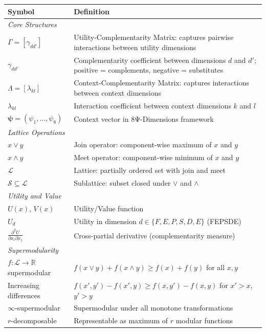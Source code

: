 \begin{table}[h]
\centering
\small
\begin{tabular}{p{2.5cm}p{10cm}}
\toprule
\textbf{Symbol} & \textbf{Definition} \\
\midrule
\multicolumn{2}{l}{\textit{Core Structures}} \\
$\Gamma = [\gamma_{dd'}]$ & Utility-Complementarity Matrix: captures pairwise interactions between utility dimensions \\
$\gamma_{dd'}$ & Complementarity coefficient between dimensions $d$ and $d'$; positive = complements, negative = substitutes \\
$\Lambda = [\lambda_{kl}]$ & Context-Complementarity Matrix: captures interactions between context dimensions \\
$\lambda_{kl}$ & Interaction coefficient between context dimensions $k$ and $l$ \\
$\boldsymbol{\psi} = (\psi_1, \ldots, \psi_8)$ & Context vector in 8Ψ-Dimensions framework \\
\midrule
\multicolumn{2}{l}{\textit{Lattice Operations}} \\
$x \vee y$ & Join operator: component-wise maximum of $x$ and $y$ \\
$x \wedge y$ & Meet operator: component-wise minimum of $x$ and $y$ \\
$\mathcal{L}$ & Lattice: partially ordered set with join and meet \\
$\mathcal{S} \subseteq \mathcal{L}$ & Sublattice: subset closed under $\vee$ and $\wedge$ \\
\midrule
\multicolumn{2}{l}{\textit{Utility and Value}} \\
$U(x)$, $V(x)$ & Utility/Value function \\
$U_d$ & Utility in dimension $d \in \{F, E, P, S, D, E\}$ (FEPSDE) \\
$\frac{\partial^2 U}{\partial x_i \partial x_j}$ & Cross-partial derivative (complementarity measure) \\
\midrule
\multicolumn{2}{l}{\textit{Supermodularity}} \\
$f: \mathcal{L} \to \mathbb{R}$ supermodular & $f(x \vee y) + f(x \wedge y) \geq f(x) + f(y)$ for all $x, y$ \\
Increasing differences & $f(x', y') - f(x', y) \geq f(x, y') - f(x, y)$ for $x' > x$, $y' > y$ \\
$\infty$-supermodular & Supermodular under all monotone transformations \\
$r$-decomposable & Representable as maximum of $r$ modular functions \\

\end{tabular}
\end{table}
